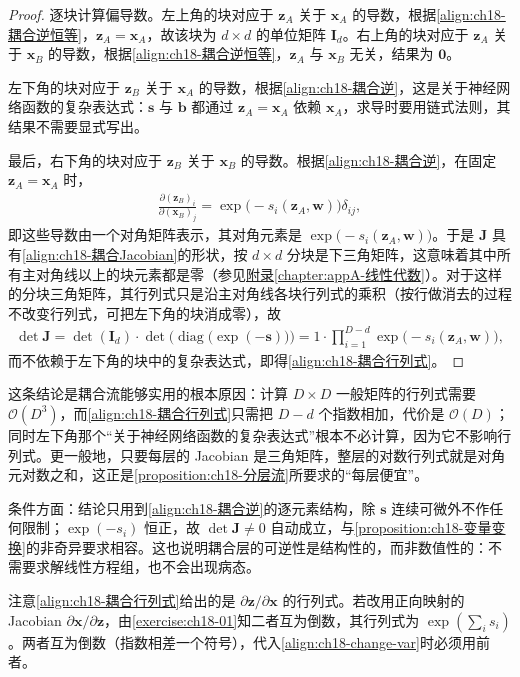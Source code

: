 \documentclass[../../main.tex]{subfiles}
\begin{document}
\begin{proof}
逐块计算偏导数。左上角的块对应于 $\bm{z}_A$ 关于 $\bm{x}_A$ 的导数，根据\eqref{align:ch18-耦合逆恒等}，$\bm{z}_A=\bm{x}_A$，故该块为 $d\times d$ 的单位矩阵 $\bm{I}_d$。右上角的块对应于 $\bm{z}_A$ 关于 $\bm{x}_B$ 的导数，根据\eqref{align:ch18-耦合逆恒等}，$\bm{z}_A$ 与 $\bm{x}_B$ 无关，结果为 $\bm{0}$。

左下角的块对应于 $\bm{z}_B$ 关于 $\bm{x}_A$ 的导数，根据\eqref{align:ch18-耦合逆}，这是关于神经网络函数的复杂表达式：$\bm{s}$ 与 $\bm{b}$ 都通过 $\bm{z}_A=\bm{x}_A$ 依赖 $\bm{x}_A$，求导时要用链式法则，其结果不需要显式写出。

最后，右下角的块对应于 $\bm{z}_B$ 关于 $\bm{x}_B$ 的导数。根据\eqref{align:ch18-耦合逆}，在固定 $\bm{z}_A=\bm{x}_A$ 时，
\begin{align*}
  \frac{\partial(\bm{z}_B)_i}{\partial(\bm{x}_B)_j}=\exp\big(-s_i(\bm{z}_A,\bm{w})\big)\delta_{ij},
\end{align*}
即这些导数由一个对角矩阵表示，其对角元素是 $\exp\big(-s_i(\bm{z}_A,\bm{w})\big)$。于是 $\bm{J}$ 具有\eqref{align:ch18-耦合Jacobian}的形状，按 $d\times d$ 分块是下三角矩阵，这意味着其中所有主对角线以上的块元素都是零（参见\hyperref[chapter:appA-线性代数]{附录\ref*{chapter:appA-线性代数}}）。对于这样的分块三角矩阵，其行列式只是沿主对角线各块行列式的乘积（按行做消去的过程不改变行列式，可把左下角的块消成零），故
\begin{align*}
  \det\bm{J}=\det(\bm{I}_d)\cdot\det\Big(\operatorname{diag}\big(\exp(-\bm{s})\big)\Big)=1\cdot\prod_{i=1}^{D-d}\exp\big(-s_i(\bm{z}_A,\bm{w})\big),
\end{align*}
而不依赖于左下角的块中的复杂表达式，即得\eqref{align:ch18-耦合行列式}。
\end{proof}

\begin{remark}
这条结论是耦合流能够实用的根本原因：计算 $D\times D$ 一般矩阵的行列式需要 $\mathcal{O}(D^{3})$，而\eqref{align:ch18-耦合行列式}只需把 $D-d$ 个指数相加，代价是 $\mathcal{O}(D)$；同时左下角那个“关于神经网络函数的复杂表达式”根本不必计算，因为它不影响行列式。更一般地，只要每层的 Jacobian 是三角矩阵，整层的对数行列式就是对角元对数之和，这正是\cref{proposition:ch18-分层流}所要求的“每层便宜”。

条件方面：结论只用到\eqref{align:ch18-耦合逆}的逐元素结构，除 $\bm{s}$ 连续可微外不作任何限制；$\exp(-s_i)$ 恒正，故 $\det\bm{J}\neq0$ 自动成立，与\cref{proposition:ch18-变量变换}的非奇异要求相容。这也说明耦合层的可逆性是结构性的，而非数值性的：不需要求解线性方程组，也不会出现病态。

注意\eqref{align:ch18-耦合行列式}给出的是 $\partial\bm{z}/\partial\bm{x}$ 的行列式。若改用正向映射的 Jacobian $\partial\bm{x}/\partial\bm{z}$，由\cref{exercise:ch18-01}知二者互为倒数，其行列式为 $\exp\left(\sum_i s_i\right)$。两者互为倒数（指数相差一个符号），代入\eqref{align:ch18-change-var}时必须用前者。
\end{remark}
\end{document}
